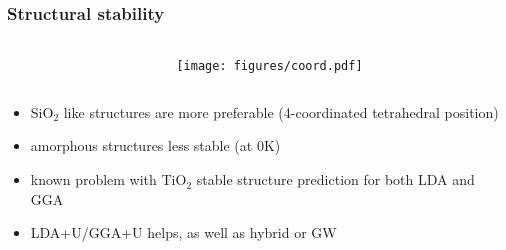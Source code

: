 \documentclass[noamsthm,8pt,t]{beamer}
\begin{document}
\begin{frame}
   \frametitle{Structural stability}
   \begin{columns}
      \begin{column}{0.67\textwidth}
            \begin{center}
            \end{center}
      \end{column}
      \begin{column}{0.33\textwidth}
         \begin{center}
            \texttt{[image: figures/coord.pdf]}
         \end{center}
      \end{column}
   \end{columns}
   \begin{itemize}
      \item SiO$_2$ like structures are more preferable (4-coordinated tetrahedral position)
      \item amorphous structures less stable (at 0K)
      \item<2-> known problem with TiO$_2$ stable structure prediction for both LDA and GGA 
      \item<2-> LDA+U/GGA+U helps\footnotemark, as well as hybrid or GW
   \end{itemize}
\end{frame}
\end{document}
